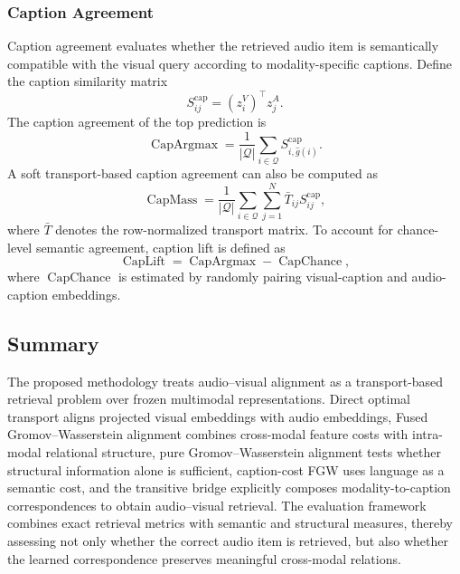 \subsubsection{Caption Agreement}

Caption agreement evaluates whether the retrieved audio item is semantically compatible with the visual query according to modality-specific captions. Define the caption similarity matrix
\begin{equation}
    S^{\mathrm{cap}}_{ij}
    =
    (z_i^V)^{\top}z_j^A.
\end{equation}
The caption agreement of the top prediction is
\begin{equation}
    \operatorname{CapArgmax}
    =
    \frac{1}{|\mathcal{Q}|}
    \sum_{i \in \mathcal{Q}}
    S^{\mathrm{cap}}_{i,\hat{g}(i)}.
    \label{eq:caption_argmax}
\end{equation}
A soft transport-based caption agreement can also be computed as
\begin{equation}
    \operatorname{CapMass}
    =
    \frac{1}{|\mathcal{Q}|}
    \sum_{i \in \mathcal{Q}}
    \sum_{j=1}^{N}
    \bar{T}_{ij}
    S^{\mathrm{cap}}_{ij},
    \label{eq:caption_mass}
\end{equation}
where $\bar{T}$ denotes the row-normalized transport matrix. To account for chance-level semantic agreement, caption lift is defined as
\begin{equation}
    \operatorname{CapLift}
    =
    \operatorname{CapArgmax}
    -
    \operatorname{CapChance},
    \label{eq:caption_lift}
\end{equation}
where $\operatorname{CapChance}$ is estimated by randomly pairing visual-caption and audio-caption embeddings.

\subsection{Summary}
\label{subsec:methodology_summary}

The proposed methodology treats audio--visual alignment as a transport-based retrieval problem over frozen multimodal representations. Direct optimal transport aligns projected visual embeddings with audio embeddings, Fused Gromov--Wasserstein alignment combines cross-modal feature costs with intra-modal relational structure, pure Gromov--Wasserstein alignment tests whether structural information alone is sufficient, caption-cost FGW uses language as a semantic cost, and the transitive bridge explicitly composes modality-to-caption correspondences to obtain audio--visual retrieval. The evaluation framework combines exact retrieval metrics with semantic and structural measures, thereby assessing not only whether the correct audio item is retrieved, but also whether the learned correspondence preserves meaningful cross-modal relations.